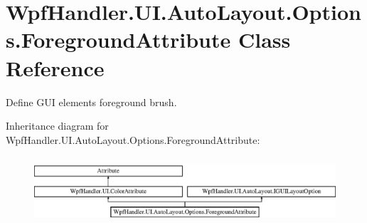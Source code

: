 \hypertarget{class_wpf_handler_1_1_u_i_1_1_auto_layout_1_1_options_1_1_foreground_attribute}{}\section{Wpf\+Handler.\+U\+I.\+Auto\+Layout.\+Options.\+Foreground\+Attribute Class Reference}
\label{class_wpf_handler_1_1_u_i_1_1_auto_layout_1_1_options_1_1_foreground_attribute}


Define G\+UI element\textquotesingle{}s foreground brush.  


Inheritance diagram for Wpf\+Handler.\+U\+I.\+Auto\+Layout.\+Options.\+Foreground\+Attribute\+:\begin{figure}[H]
\begin{center}
\leavevmode
\includegraphics[height=2.507463cm]{dc/df7/class_wpf_handler_1_1_u_i_1_1_auto_layout_1_1_options_1_1_foreground_attribute}
\end{center}
\end{figure}

